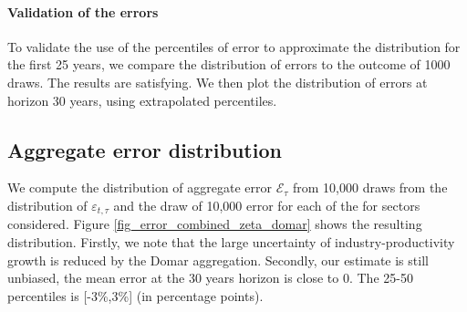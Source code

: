 \documentclass[11pt]{article}
\begin{document}
\paragraph{Validation of the errors}

To validate the use of the percentiles of error to approximate the distribution for the first 25 years, we compare the distribution of errors to the outcome of 1000 draws. The results are satisfying. We then plot the distribution of errors at horizon 30 years, using extrapolated percentiles.




\subsection{Aggregate error distribution}

We compute the distribution of aggregate error $\mathcal{E}_{\tau}$ from 10,000 draws from the distribution of $\varepsilon_{t,\tau}$ and the draw of 10,000 error for each of the for sectors considered. Figure \ref{fig_error_combined_zeta_domar} shows the resulting distribution. Firstly, we note that the large uncertainty of industry-productivity growth is reduced by the Domar aggregation. Secondly, our estimate is still unbiased, the mean error at the 30 years horizon is close to 0. The 25-50 percentiles is [-3\%,3\%] (in percentage points).

\end{document}
